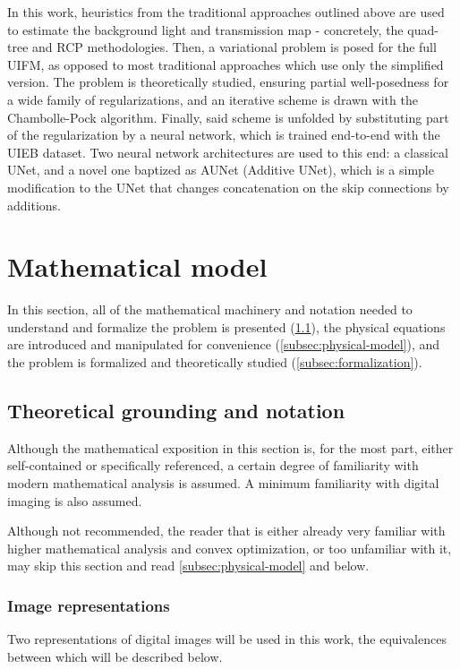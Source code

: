 \documentclass[twocolumn,twoside,a4paper,10pt]{IEEEtran}
\begin{document}
In this work, heuristics from the traditional approaches outlined above are used to estimate the background light and transmission map - concretely, the quad-tree and RCP methodologies. Then, a variational problem is posed for the
full UIFM, as opposed to most traditional approaches which use only the simplified version. The problem is theoretically studied, ensuring partial well-posedness for a wide family of regularizations, and an iterative scheme is
drawn with the Chambolle-Pock algorithm. Finally, said scheme is unfolded by
substituting part of the regularization by a neural network, which is trained
end-to-end with the UIEB dataset. Two neural network architectures are used
to this end: a classical UNet, and a novel one baptized as AUNet (Additive UNet),
which is a simple modification to the UNet that changes concatenation on the
skip connections by additions.
\section{Mathematical model}

In this section, all of the mathematical machinery and notation needed to understand and formalize the problem is presented (\cref{subsec:theoretical-grounding}), the physical equations are introduced and manipulated for convenience (\cref{subsec:physical-model}), and the problem is formalized and theoretically studied (\cref{subsec:formalization}).

\subsection{Theoretical grounding and notation}\label{subsec:theoretical-grounding}
Although the mathematical exposition in this section is, for the most part, either self-contained or specifically referenced, a certain degree of familiarity with modern mathematical analysis is assumed. A minimum familiarity with digital imaging is also assumed.

Although not recommended, the reader that is either already very familiar with higher mathematical analysis and convex optimization, or too unfamiliar with it, may skip this section and read \cref{subsec:physical-model} and below.

\subsubsection{Image representations}

Two representations of digital images will be used in this work, the equivalences between which will be described below.
\end{document}
